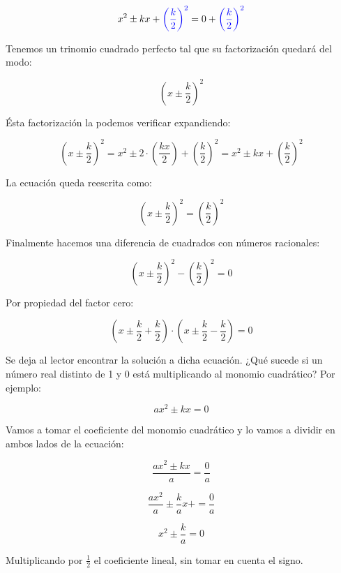 \documentclass[letterpaper, 10pt, oneside]{book}
\begin{document}
	$$x^2\pm kx+{\color{blue}\left(\frac{k}{2}\right)^2}=0+{\color{blue}\left(\frac{k}{2}\right)^2}$$\newline
	
	Tenemos un trinomio cuadrado perfecto tal que su factorización quedará del modo:\newline
	
	$$\left(x\pm \frac{k}{2}\right)^2$$
	
	Ésta factorización la podemos verificar expandiendo:\newline
	
	$$\left(x\pm \frac{k}{2}\right)^2 = x^2\pm2\cdot \left(\frac{kx}{2}\right) + \left(\frac{k}{2}\right)^2 = x^2 \pm kx + \left(\frac{k}{2}\right)^2$$\newline
	
	La ecuación queda reescrita como:\newline
	
	$$\left(x\pm \frac{k}{2}\right)^2=\left(\frac{k}{2}\right)^2$$\newline
	
	Finalmente hacemos una diferencia de cuadrados con números racionales:\newline
	
	$$\left(x\pm \frac{k}{2}\right)^2-\left(\frac{k}{2}\right)^2=0$$\newline
	
	Por propiedad del factor cero:\newline
	
	$$\left(x\pm \frac{k}{2}+\frac{k}{2}\right)\cdot \left(x\pm \frac{k}{2}-\frac{k}{2}\right)=0$$\newline
	
	Se deja al lector encontrar la solución a dicha ecuación. ¿Qué sucede si un número real distinto de 1 y 0 está multiplicando al monomio cuadrático? Por ejemplo:
	
	$$ax^2 \pm kx = 0$$\newline
	
	Vamos a tomar el coeficiente del monomio cuadrático y lo vamos a dividir en ambos lados de la ecuación: \newline 
	
	$$\frac{ax^2 \pm kx}{a} = \frac{0}{a}$$
	
	$$\frac{ax^2}{a} \pm \frac{k}{a}x +  = \frac{0}{a}$$
	
	$$x^2 \pm \frac{k}{a} = 0$$
	
	Multiplicando por $\displaystyle{\frac{1}{2}}$ el coeficiente lineal, sin tomar en cuenta el signo. \newline
	
\end{document}
